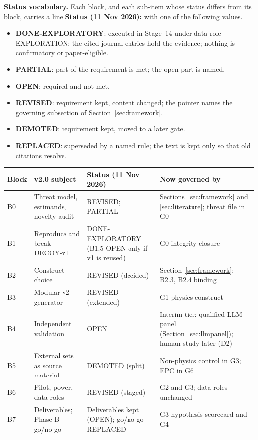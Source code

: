 \documentclass[10pt,a4paper]{article}
\begin{document}
\textbf{Status vocabulary.} Each block, and each sub-item whose status differs from its block, carries a line
\textbf{Status (11 Nov 2026):} with one of the following values.
\begin{itemize}
\item \textbf{DONE-EXPLORATORY}: executed in Stage~14 under data role EXPLORATION; the cited journal entries hold
the evidence; nothing is confirmatory or paper-eligible.
\item \textbf{PARTIAL}: part of the requirement is met; the open part is named.
\item \textbf{OPEN}: required and not met.
\item \textbf{REVISED}: requirement kept, content changed; the pointer names the governing subsection of
Section~\ref{sec:framework}.
\item \textbf{DEMOTED}: requirement kept, moved to a later gate.
\item \textbf{REPLACED}: superseded by a named rule; the text is kept only so that old citations resolve.
\end{itemize}

\begin{center}\small
\begin{tabularx}{\linewidth}{@{}P{0.9cm}P{4.2cm}P{3.6cm}L@{}}
\toprule
Block & v2.0 subject & Status (11 Nov 2026) & Now governed by \\
\midrule
B0 & Threat model, estimands, novelty audit & REVISED; PARTIAL & Sections~\ref{sec:framework} and \ref{sec:literature}; threat file in G0 \\
B1 & Reproduce and break DECOY-v1 & DONE-EXPLORATORY (B1.5 OPEN only if v1 is reused) & G0 integrity closure \\
B2 & Construct choice & REVISED (decided) & Section~\ref{sec:framework}; B2.3, B2.4 binding \\
B3 & Modular v2 generator & REVISED (extended) & G1 physics construct \\
B4 & Independent validation & OPEN & Interim tier: qualified LLM panel (Section~\ref{sec:llmpanel}); human study later (D2) \\
B5 & External sets as source material & DEMOTED (split) & Non-physics control in G3; EPC in G6 \\
B6 & Pilot, power, data roles & REVISED (staged) & G2 and G3; data roles unchanged \\
B7 & Deliverables; Phase-B go/no-go & Deliverables kept (OPEN); go/no-go REPLACED & G3 hypothesis scorecard and G4 \\
\bottomrule
\end{tabularx}
\end{center}
\end{document}
